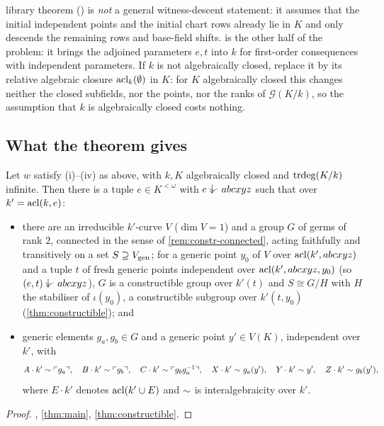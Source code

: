 \begin{remark}
library theorem 
() is \emph{not} a general
witness-descent statement: it assumes that the initial independent points and the
initial chart rows already lie in $K$ and only descends the remaining rows and
base-field shifts.   is the other half of the problem: it brings the
adjoined parameters $e,t$ into $k$ for first-order consequences with independent
parameters.  If $k$ is not algebraically closed, replace it by its
relative algebraic closure $\operatorname{acl}_k(\emptyset)$ in $K$: for $K$ algebraically closed this
changes neither the closed subfields, nor the points, nor the ranks of $\mathcal G(K/k)$, so
the assumption that $k$ is algebraically closed costs nothing.
\end{remark}

\subsection{What the theorem gives}

\begin{corollary}\label{cor:psi}
Let $w$ satisfy (i)--(iv) as above, with $k,K$ algebraically closed and $\operatorname{trdeg}(K/k)$
infinite.  Then there is a tuple $e\in K^{<\omega}$ with $e\ind{}abcxyz$ such that over
$k'=\operatorname{acl}(k,e)$:
\begin{itemize}[nosep]
\item there are an irreducible $k'$-curve $V$ ($\dim V=1$) and a group $G$ of germs of
  rank $2$, connected in the sense of \cref{rem:constr-connected}, acting faithfully and
  transitively on a set $S\supseteq V_{\operatorname{gen}}$; for a generic point $y_0$ of $V$ over
  $\operatorname{acl}(k',abcxyz)$ and a tuple $t$ of fresh generic points independent over
  $\operatorname{acl}(k',abcxyz,y_0)$ (so $(e,t)\ind{}abcxyz$), $G$ is a constructible group over
  $k'(t)$ and $S\cong G/H$ with $H$ the stabiliser of $\iota(y_0)$, a constructible
  subgroup over $k'(t,y_0)$ (\cref{thm:constructible}); and
\item generic elements $g_a,g_b\in G$ and a generic point $y'\in V(K)$, independent over
  $k'$, with
  \[
    A\cdot k'\sim\ulcorner g_a\urcorner,\quad B\cdot k'\sim\ulcorner g_b\urcorner,\quad
    C\cdot k'\sim\ulcorner g_bg_a^{-1}\urcorner,\quad X\cdot k'\sim g_a(y'),\quad
    Y\cdot k'\sim y',\quad Z\cdot k'\sim g_b(y'),
  \]
  where $E\cdot k'$ denotes $\operatorname{acl}(k'\cup E)$ and $\sim$ is interalgebraicity over $k'$.
\end{itemize}
\end{corollary}
\begin{proof}
, \cref{thm:main}, \cref{thm:constructible}.
\end{proof}

